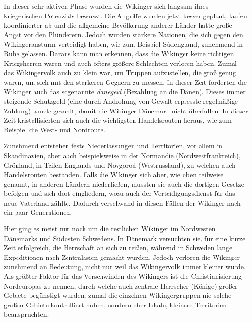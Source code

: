 \documentclass[12pt,a4paper,ngerman,openany]{book}
\begin{document}
\begin{tcolorbox}[sharp corners, title=Ungefähr 850 bis 900]
In dieser sehr aktiven Phase wurden die Wikinger sich langsam ihres kriegerischen Potenzials bewusst. Die Angriffe wurden jetzt besser geplant, laufen koordinierter ab und die allgemeine Bevölkerung anderer Länder hatte große Angst vor den Plünderern.
Jedoch wurden stärkere Nationen, die sich gegen den Wikingeransturm verteidigt haben, wie zum Beispiel Südengland, zunehmend in Ruhe gelassen. Daraus kann man erkennen, dass die Wikinger keine richtigen Kriegsherren waren und auch öfters größere Schlachten verloren haben. Zumal das Wikingervolk auch zu klein war, um Truppen aufzustellen, die groß genug wären, um sich mit den stärkeren Gegnern zu messen.
In dieser Zeit forderten die Wikinger auch das sogenannte \textit{danegeld} (\glqq Bezahlung an die Dänen\grqq{}). Dieses immer steigende Schutzgeld (eine durch Androhung von Gewalt erpresste regelmäßige Zahlung) wurde gezahlt, damit die Wikinger Dänemark nicht überfallen.
In dieser Zeit kristallisierten sich auch die wichtigsten Handelsrouten heraus, wie zum Beispiel die West- und Nordroute.
\end{tcolorbox}

\begin{tcolorbox}[sharp corners, title=Ungefähr 900 bis 980]
Zunehmend entstehen feste Niederlassungen und Territorien, vor allem in Skandinavien, aber auch beispielsweise in der Normandie (Nordwestfrankreich), Grönland, in Teilen Englands und Novgorod (Westrussland), zu welchen auch Handelsrouten bestanden. Falls die Wikinger sich aber, wie oben teilweise genannt, in anderen Ländern niederließen, mussten sie auch die dortigen Gesetze befolgen und sich dort eingliedern, wozu auch der Verteidigungsdienst für das \glqq neue\grqq{} Vaterland zählte. Dadurch verschwand in diesen Fällen \glqq der Wikinger\grqq{} nach ein paar Generationen.
\end{tcolorbox}

\begin{tcolorbox}[sharp corners, title=Ungefähr 980 bis 1066]
Hier ging es meist nur noch um die restlichen Wikinger im Nordwesten Dänemarks und Südosten Schwedens. In Dänemark versuchten sie, für eine kurze Zeit erfolgreich, die Herrschaft an sich zu reißen, während in Schweden lange Expeditionen nach Zentralasien gemacht wurden. Jedoch verloren die Wikinger zunehmend an Bedeutung, nicht nur weil das Wikingervolk immer kleiner wurde. Als größter Faktor für das \glqq Verschwinden\grqq{} des Wikingers ist die Christianisierung Nordeuropas zu nennen, durch welche auch zentrale Herrscher (Könige) großer Gebiete begünstigt wurden, zumal die einzelnen Wikingergruppen nie solche großen Gebiete kontrolliert haben, sondern eher lokale, kleinere Territorien beanspruchten.
\end{tcolorbox}
\end{document}
